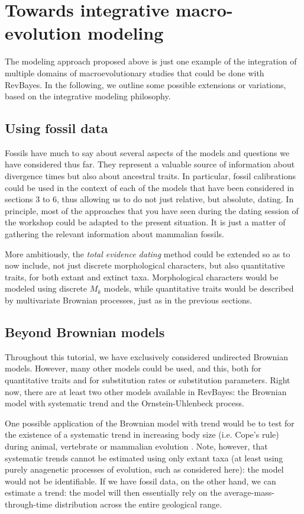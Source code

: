 \documentclass[usletter]{article}
\begin{document}
\section{Towards integrative macro-evolution modeling}

The modeling approach proposed above is just one example of the integration of multiple domains of macroevolutionary studies that could be done with RevBayes.
In the following, we outline some possible extensions or variations, based on the integrative modeling philosophy.

\subsection*{Using fossil data}

Fossils have much to say about several aspects of the models and questions we have considered thus far.
They represent a valuable source of information about divergence times but also about ancestral traits.
In particular, fossil calibrations could be used in the context of each of the models that have been considered in sections 3 to 6, thus allowing us to do not just relative, but absolute, dating. In principle, most of the approaches that you have seen during the dating session of the workshop could be adapted to the present situation. It is just a matter of gathering the relevant information about mammalian fossils.

More ambitiously, the \emph{total evidence dating} method \citep{Ronquist:2012ea} could be extended so as to now include, not just discrete morphological characters, but also quantitative traits, for both extant and extinct taxa. Morphological characters would be modeled using discrete $M_k$ models, while quantitative traits would be described by multivariate Brownian processes, just as in the previous sections.

\subsection*{Beyond Brownian models}

Throughout this tutorial, we have exclusively considered undirected Brownian models.
However, many other models could be used,
and this,
both for quantitative traits and for substitution rates or substitution parameters.
Right now, there are at least two other models available in RevBayes:
the Brownian model with systematic trend and the Ornstein-Uhlenbeck process.

One possible application of the Brownian model with trend would be to test for the existence of a systematic trend in increasing body size (i.e. Cope's rule) during animal, vertebrate or mammalian evolution \citep{Alroy:1998p270}. Note, however, that systematic trends cannot be estimated using only extant taxa (at least using purely anagenetic processes of evolution, such as considered here): the model would not be identifiable.
If we have fossil data, on the other hand, we can estimate a trend:
the model will then essentially rely on the average-mass-through-time distribution across the entire geological range.
\end{document}
